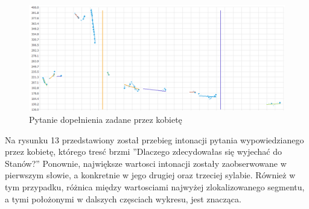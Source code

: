 \documentclass[a4paper,12 pt]{article}
\begin{document}
 \FloatBarrier
\begin{figure}[h]
\centering
\includegraphics[scale=0.7]{pytanie_dopelnienia_kobieta.png}
\caption{Pytanie dopełnienia zadane przez kobietę}
\end{figure}
\FloatBarrier
Na rysunku 13 przedstawiony został przebieg intonacji pytania wypowiedzianego przez kobietę, którego tresć brzmi ''Dlaczego zdecydowałas się wyjechać do Stanów?'' Ponownie, największe wartosci intonacji zostały zaobserwowane w pierwszym słowie, a konkretnie w jego drugiej oraz trzeciej sylabie. Również w tym przypadku, różnica między wartosciami najwyżej zlokalizowanego segmentu, a tymi położonymi w dalszych częsciach wykresu, jest znacząca.
\end{document}

